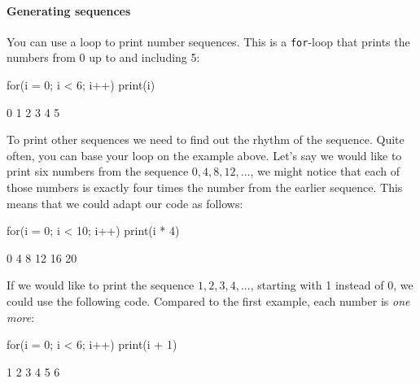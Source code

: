 \paragraph{Generating sequences}

You can use a loop to print number sequences. This is a \texttt{for}-loop that prints the numbers from 0 up to and including 5:

\begin{minipage}[t]{0.5\textwidth}
\begin{nllisting}
for(i = 0; i < 6; i++)
    print(i)
\end{nllisting}
\end{minipage}%
\begin{minipage}[t]{0.5\textwidth}
\begin{bklisting}
0
1
2
3
4
5
\end{bklisting}
\end{minipage}

To print other sequences we need to find out the rhythm of the sequence. Quite often, you can base your loop on the example above. Let's say we would like to print six numbers from the sequence $0, 4, 8, 12, ...$, we might notice that each of those numbers is exactly four times the number from the earlier sequence. This means that we could adapt our code as follows:

\begin{minipage}[t]{0.5\textwidth}
\begin{nllisting}
for(i = 0; i < 10; i++)
    print(i * 4)
\end{nllisting}
\end{minipage}%
\begin{minipage}[t]{0.5\textwidth}
\begin{bklisting}
0
4
8
12
16
20
\end{bklisting}
\end{minipage}

If we would like to print the sequence $1, 2, 3, 4, ...$, starting with 1 instead of 0, we could use the following code. Compared to the first example, each number is \emph{one more}:

\begin{minipage}[t]{0.5\textwidth}
\begin{nllisting}
for(i = 0; i < 6; i++)
    print(i + 1)
\end{nllisting}
\end{minipage}
\begin{minipage}[t]{0.5\textwidth}
\begin{bklisting}
1
2
3
4
5
6
\end{bklisting}
\end{minipage}

